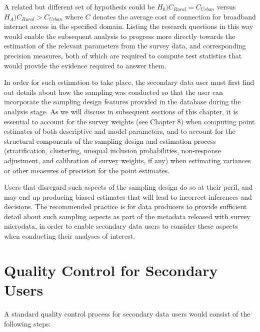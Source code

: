 \documentclass[
  12pt,
]{book}
\begin{document}
A related but different set of hypothesis could be \(H_0) C_{Rural} = C_{Urban}\) versus \(H_A) C_{Rural} > C_{Urban}\) where \(C\) denotes the average cost of connection for broadband internet access in the specified domain. Listing the research questions in this way would enable the subsequent analysis to progress more directly towards the estimation of the relevant parameters from the survey data, and corresponding precision measures, both of which are required to compute test statistics that would provide the evidence required to answer them.

In order for such estimation to take place, the secondary data user must first find out details about how the sampling was conducted so that the user can incorporate the sampling design features provided in the database during the analysis stage. As we will discuss in subsequent sections of this chapter, it is essential to account for the survey weights (see Chapter 8) when computing point estimates of both descriptive and model parameters, and to account for the structural components of the sampling design and estimation process (stratification, clustering, unequal inclusion probabilities, non-response adjustment, and calibration of survey weights, if any) when estimating variances or other measures of precision for the point estimates.

Users that disregard such aspects of the sampling design do so at their peril, and may end up producing biased estimates that will lead to incorrect inferences and decisions. The recommended practice is for data producers to provide sufficient detail about such sampling aspects as part of the metadata released with survey microdata, in order to enable secondary data users to consider these aspects when conducting their analyses of interest.

\hypertarget{quality-control-for-secondary-users}{%
\section{Quality Control for Secondary Users}\label{quality-control-for-secondary-users}}

A standard quality control process for secondary data users would consist of the following steps:
\end{document}
